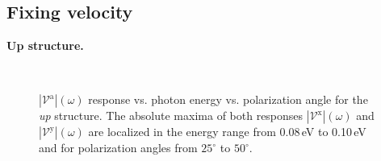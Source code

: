 \documentclass[prb,11pt,tightenlines,twocolumn,aps]{revtex4-1}
\begin{document}


\subsection{Fixing velocity} %
\label{sec:res-fixvel}



\textbf{Up structure.}
\begin{figure}[t]
    \centering
    \\
    
    \caption{$|\mathcal{V}^{\mathrm{a}}|(\omega)$ response vs. photon energy vs.
    polarization angle for the \emph{up} structure. The absolute maxima of both
    responses $|\mathcal{V}^{\mathrm{x}}|(\omega)$ and
    $|\mathcal{V}^{\mathrm{y}}|(\omega)$ are localized in the energy
    range from 0.08\,eV to 0.10\,eV and for polarization angles from
    $25^{\circ}$ to $50^{\circ}$.}
    \label{fig:up-3d-vva-1}
\end{figure}
\end{document}
